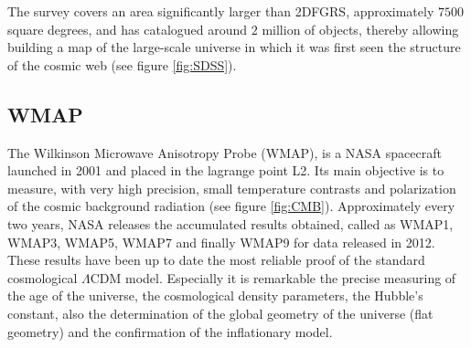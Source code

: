 The survey covers an area significantly larger than 2DFGRS, 
approximately $7500$ square degrees, and has catalogued around $2$ million
of objects, thereby allowing building a map of the large-scale universe in 
which it was first seen the structure of the cosmic web (see figure 
\ref{fig:SDSS}).


	
	\subsection*{WMAP}
	\label{subsec:WMAP}


The Wilkinson Microwave Anisotropy Probe (WMAP), is a NASA spacecraft 
launched in 2001 and placed in the lagrange point L2. Its main objective
is to measure, with very high precision, small temperature contrasts and 
polarization of the cosmic background radiation (see figure \ref{fig:CMB}).
Approximately every two years, NASA releases the accumulated results 
obtained, called as WMAP1, WMAP3, WMAP5, WMAP7 and finally WMAP9 for data 
released in 2012. These results have been up to date the most reliable 
proof of the standard cosmological $\Lambda$CDM model. Especially it is
remarkable the precise measuring of the age of the universe, the 
cosmological density parameters, the Hubble's constant, also the 
determination of the global geometry of the universe (flat geometry) and
the confirmation of the inflationary model.


